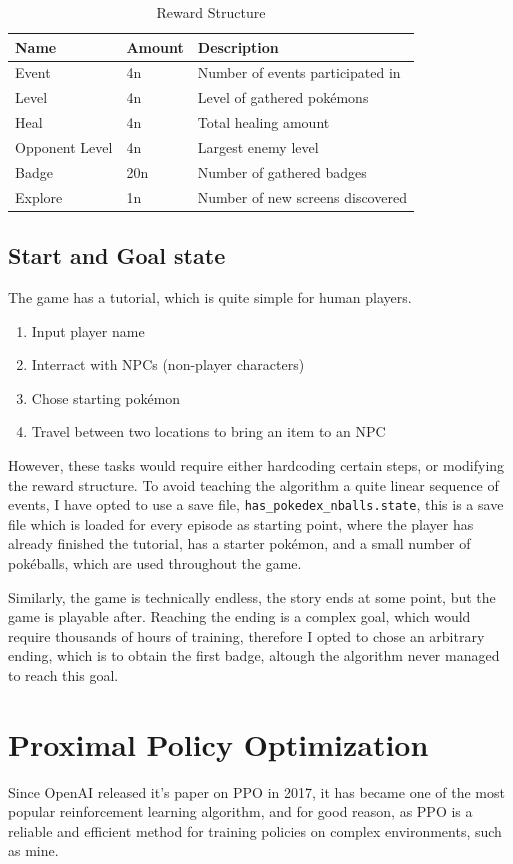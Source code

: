 \documentclass{article}
\begin{document}
\begin{table}
  \caption{Reward Structure}
  \label{reward-table}
  \centering
  \begin{tabular}{lll}
    \toprule
    Name     & Amount     & Description \\
    \midrule
    Event & 4n & Number of events participated in\\
    Level & 4n & Level of gathered pokémons\\
    Heal & 4n & Total healing amount\\
    Opponent Level & 4n & Largest enemy level\\
    Badge & 20n & Number of gathered badges\\
    Explore & 1n & Number of new screens discovered\\
    \bottomrule
  \end{tabular}
\end{table}

\subsection{Start and Goal state}
	The game has a tutorial, which is quite simple for human players.
	\begin{enumerate}
		\item Input player name
		\item Interract with NPCs (non-player characters)
		\item Chose starting pokémon
		\item Travel between two locations to bring an item to an NPC
	\end{enumerate}
	However, these tasks would require either hardcoding certain steps, or modifying the reward structure. To avoid teaching the algorithm a quite linear sequence of events, I have opted to use a save file, {\tt has\_pokedex\_nballs.state}, this is a save file which is loaded for every episode as starting point, where the player has already finished the tutorial, has a starter pokémon, and a small number of pokéballs, which are used throughout the game.


	Similarly, the game is technically endless, the story ends at some point, but the game is playable after. Reaching the ending is a complex goal, which would require thousands of hours of training, therefore I opted to chose an arbitrary ending, which is to obtain the first badge, altough the algorithm never managed to reach this goal.

\section{Proximal Policy Optimization}
	Since OpenAI released it's paper on PPO in 2017, it has became one of the most popular reinforcement learning algorithm, and for good reason, as PPO is a reliable and efficient method for training policies on complex environments, such as mine.
\end{document}
